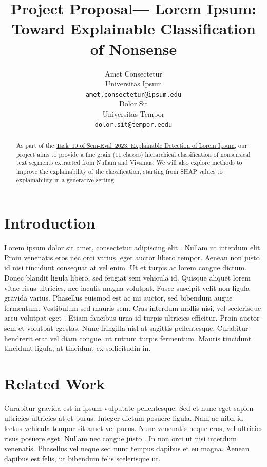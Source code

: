 \documentclass[11pt]{article}
\title{Project Proposal— Lorem Ipsum: Toward Explainable Classification of Nonsense}
\author{Amet Consectetur \\
  Universitas Ipsum\\
  \texttt{amet.consectetur@ipsum.edu} \\\And
  Dolor Sit \\
  Universitas Tempor\\
  \texttt{dolor.sit@tempor.eedu} \\}
\begin{document}
\maketitle
\begin{abstract}
As part of the \href{https://codalab.lisn.upsaclay.fr/competitions/7124#learn_the_details-overview}{Task~10 of Sem-Eval~2023: Explainable Detection of Lorem Ipsum}, our project aims to provide a fine grain (11 classes) hierarchical classification of nonsensical text segments extracted from Nullam and Vivamus. We will also explore methods to improve the explainability of the classification, starting from SHAP values to explainability in a generative setting.
\end{abstract}
\section{Introduction}
Lorem ipsum dolor sit amet, consectetur adipiscing elit \cite{sanchez-2020-automatic-classification}. Nullam ut interdum elit. Proin venenatis eros nec orci varius, eget auctor libero tempor. Aenean non justo id nisi tincidunt consequat at vel enim. Ut et turpis ac lorem congue dictum. Donec blandit ligula libero, sed feugiat sem vehicula id. Quisque aliquet lorem vitae risus ultricies, nec iaculis magna volutpat. Fusce suscipit velit non ligula gravida varius. Phasellus euismod est ac mi auctor, sed bibendum augue fermentum. \newline
Vestibulum sed mauris sem. Cras interdum mollis nisi, vel scelerisque arcu volutpat eget \cite{vidgen-etal-2019-challenges}. Etiam faucibus urna id turpis ultricies efficitur. Proin auctor sem et volutpat egestas. Nunc fringilla nisl at sagittis pellentesque. Curabitur hendrerit erat vel diam congue, ut rutrum turpis fermentum. Mauris tincidunt tincidunt ligula, at tincidunt ex sollicitudin in.
\section{Related Work}
Curabitur gravida est in ipsum vulputate pellentesque. Sed et nunc eget sapien ultricies ultricies at et purus. Integer dictum posuere ligula. Nam ac nibh id lectus vehicula tempor sit amet vel purus. Nunc venenatis neque eros, vel ultricies risus posuere eget. Nullam nec congue justo \cite{Vidgen_2020}. In non orci ut nisi interdum venenatis. Phasellus vel neque sed nunc tempus dapibus et eu magna. Aenean dapibus est felis, ut bibendum felis scelerisque ut.
\end{document}
